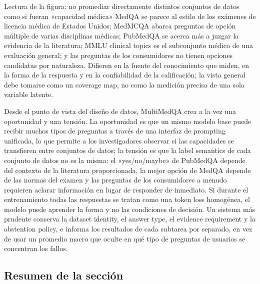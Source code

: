 \documentclass[a4paper]{article}
\begin{document}
\begin{knowledgebox}{Lectura de la figura: no promediar directamente distintos conjuntos de datos como si fueran «capacidad médica»}
MedQA se parece al estilo de los exámenes de licencia médica de Estados Unidos; MedMCQA abarca preguntas de opción múltiple de varias disciplinas médicas; PubMedQA se acerca más a juzgar la evidencia de la literatura; MMLU clinical topics es el subconjunto médico de una evaluación general; y las preguntas de los consumidores no tienen opciones candidatas por naturaleza. Difieren en la fuente del conocimiento que miden, en la forma de la respuesta y en la confiabilidad de la calificación; la vista general debe tomarse como un coverage map, no como la medición precisa de una sola variable latente.
\end{knowledgebox}

Desde el punto de vista del diseño de datos, MultiMedQA crea a la vez una oportunidad y una tensión. La oportunidad es que un mismo modelo base puede recibir muchos tipos de preguntas a través de una interfaz de prompting unificada, lo que permite a los investigadores observar si las capacidades se transfieren entre conjuntos de datos; la tensión es que la label semantics de cada conjunto de datos no es la misma: el «yes/no/maybe» de PubMedQA depende del contexto de la literatura proporcionada, la mejor opción de MedQA depende de las normas del examen y las preguntas de los consumidores a menudo requieren aclarar información en lugar de responder de inmediato. Si durante el entrenamiento todas las respuestas se tratan como una token loss homogénea, el modelo puede aprender la forma y no las condiciones de decisión. Un sistema más prudente conserva la dataset identity, el answer type, el evidence requirement y la abstention policy, e informa los resultados de cada subtarea por separado, en vez de usar un promedio macro que oculte en qué tipo de preguntas de usuarios se concentran los fallos.


\subsection{Resumen de la sección}
\end{document}
